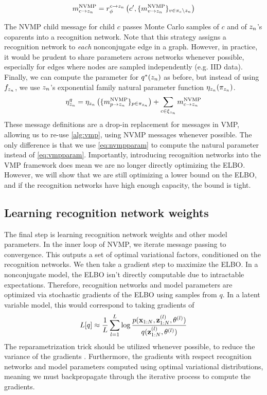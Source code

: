 \begin{equation}
    m^{\text{NVMP}}_{c \rightarrow z_n} = r^{c\rightarrow z_n}_{\phi}\left(
    c', \{m^{\text{NVMP}}_{v \rightarrow z_n}\}_{v \in \pi_c \backslash z_n}\right)
\end{equation}

The NVMP child message for child $c$ passes Monte Carlo samples
of $c$ and of $z_n$'s coparents into a recognition network.
Note that this strategy assigns a recognition
network to \emph{each} nonconjugate edge
in a graph. However, in practice,
it would be prudent to share parameters
across networks
whenever possible,
especially for edges where nodes are sampled
independently (e.g. IID data).
Finally, we can compute the parameter for $q^*(z_n)$
as before, but instead of using $f_{z_n}$, we use $z_n$'s
exponential family natural parameter function $\eta_{z_n}(\pi_{z_n})$.
\begin{equation}
    \label{eq:nvmpparam}
   \eta^q_{z_n} = \eta_{z_n}\left(\{m^{\text{NVMP}}_{p \rightarrow z_n}\}_{p \in \pi_{z_n}}\right) + \sum_{c \in \xi_{z_n}} m^{\text{NVMP}}_{c \rightarrow z_n}
\end{equation}
These message definitions are a drop-in replacement
for messages in VMP, allowing us to re-use \autoref{alg:vmp},
using NVMP messages whenever possible. The only
difference is that we use \autoref{eq:nvmpparam} to compute
the natural parameter instead of \autoref{eq:vmpparam}.
Importantly, introducing recognition networks
into the VMP framework does mean we are no longer
directly optimizing the ELBO. However, we will
show that we are still optimizing a lower
bound on the ELBO, and if the recognition networks
have high enough capacity, the bound is tight.

\subsection{Learning recognition network weights}
The final step is learning recognition network
weights and other model parameters.
In the inner loop of NVMP, we
iterate message passing to convergence.
This outputs a set of optimal variational
factors, conditioned on the recognition networks.
We then take a gradient step
to maximize the ELBO.
In a nonconjugate model, the ELBO isn't
directly computable due to intractable expectations.
Therefore, 
recognition networks and model parameters are optimized
via stochastic gradients of the ELBO using samples from $q$.
In a latent variable model, this would correspond to 
taking gradients of
\begin{equation}
    L[q] \approx \frac{1}{L}\sum_{l = 1}^L \log \frac{p(\mathbf{x}_{1:N}, \mathbf{z}_{1:N}^{(l)}, \theta^{(l)})}{q(\mathbf{z}_{1:N}^{(l)}, \theta^{(l)})}
\end{equation}
The reparametrization trick should be utilized whenever possible,
to reduce the variance of the gradients \citep{Kingma2013}.
Furthermore, the gradients with respect recognition networks
and model parameters computed using optimal variational
distributions, meaning we must backpropagate through
the iterative process to compute the gradients.

